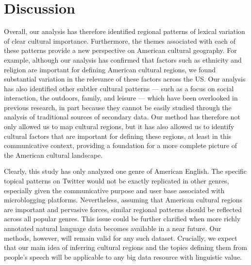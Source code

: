 \documentclass[../thesis.tex]{subfiles}
\begin{document}
\section{Discussion}
Overall, our analysis has therefore identified regional patterns of lexical variation of
clear cultural importance. Furthermore, the themes associated with each of these
patterns provide a new perspective on American cultural geography. For example, although
our analysis has confirmed that factors such as ethnicity and religion are important for
defining American cultural regions, we found substantial variation in the relevance of
these factors across the US. Our analysis has also identified other subtler cultural
patterns --- such as a focus on social interaction, the outdoors, family, and
leisure --- which have been overlooked in previous research, in part because they cannot
be easily studied through the analysis of traditional sources of secondary data. Our
method has therefore not only allowed us to map cultural regions, but it has also
allowed us to identify cultural factors that are important for defining these regions,
at least in this communicative context, providing a foundation for a more complete
picture of the American cultural landscape.

Clearly, this study has only analyzed one genre of American English. The specific topical
patterns on Twitter would not be exactly replicated in other genres, especially given
the communicative purpose and user base associated with microblogging platforms.
Nevertheless, assuming that American cultural regions are important and pervasive
forces, similar regional patterns should be reflected across all popular genres. This issue
could be further clarified when more richly annotated natural language data becomes
available in a near future. Our methods, however, will remain valid for any such
dataset. Crucially, we expect that our main idea of inferring cultural regions and the
topics defining them from people's speech will be applicable to any big data resource
with linguistic value.
\end{document}
